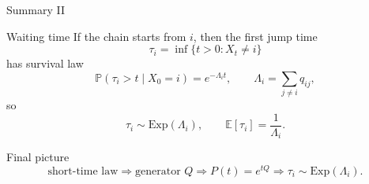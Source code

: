 \documentclass[aspectratio=169,professionalfonts]{beamer}
\newcommand{\Prob}{\mathbb{P}}
\newcommand{\E}{\mathbb{E}}
\begin{document}
\begin{frame}{Summary II}
\scriptsize
\begin{alertblock}{Waiting time}
If the chain starts from $i$, then the first jump time
\[
\tau_i=\inf\{t>0:X_t\neq i\}
\]
has survival law
\[
\Prob(\tau_i>t\mid X_0=i)=e^{-\Lambda_i t},
\qquad
\Lambda_i=\sum_{j\neq i}q_{ij},
\]
so
\[
\tau_i\sim \mathrm{Exp}(\Lambda_i),\qquad
\E[\tau_i]=\frac{1}{\Lambda_i}.
\]
\end{alertblock}

\begin{block}{Final picture}
\[
\text{short-time law}
\Longrightarrow
\text{generator }Q
\Longrightarrow
P(t)=e^{tQ}
\Longrightarrow
\tau_i\sim \mathrm{Exp}(\Lambda_i).
\]
\end{block}
\end{frame}
\end{document}

